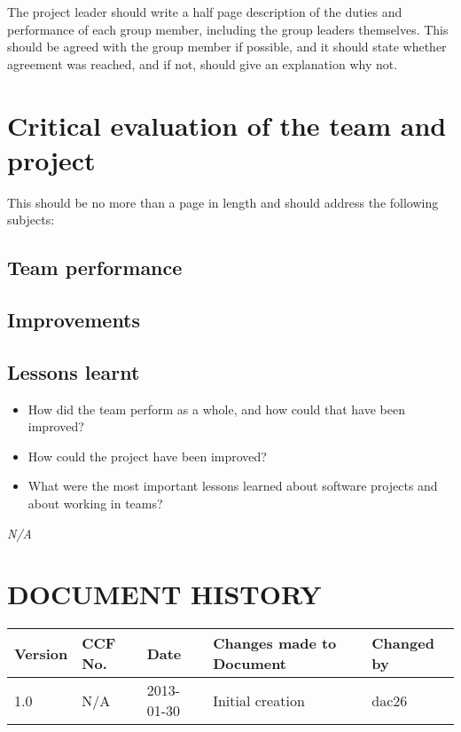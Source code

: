 \documentclass{project}
\begin{document}
The project leader should write a half page description of the duties and
performance of each group member, including the group leaders themselves. This should be agreed with the
group member if possible, and it should state whether agreement was reached, and if not, should give an
explanation why not.


\section{Critical evaluation of the team and project}
This should be no more than a page in length and should address
the following subjects:
\subsection{Team performance}


\subsection{Improvements}


\subsection{Lessons learnt}

\begin{itemize}
	\item How did the team perform as a whole, and how could that have been improved?
	\item How could the project have been improved?
	\item What were the most important lessons learned about software projects and about working in teams?

\end{itemize}
\clearpage
{}
\begin{thebibliography}{5}
\bibitem{} \emph{N/A}
\end{thebibliography}
\clearpage
{}
\section*{DOCUMENT HISTORY}
\begin{tabular}{|l | l | l | l | l |}
\hline
Version & CCF No. & Date & Changes made to Document & Changed by \\
\hline
1.0 & N/A & 2013-01-30 & Initial creation & dac26 \\
\hline
\end{tabular}
\label{thelastpage}
\end{document}
